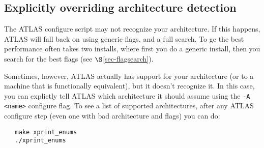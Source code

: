 \documentclass[11pt]{article}
\newcommand{\Wskip}[1]{ }
\begin{document}
\Wskip{
\subsection{Manually setting OS, architecture, assembly dialect}
\label{sec-OS-override}

Configure's selection of operating system, architecture, assembly dialect
and SIMD vectorization type are all controlled by enumerated types.
Occasionally, configure will misdetect one of these values and so
configure provides
flags for overriding configures detecting of these features.

\subsubsection{Manually overriding the assembly dialect}
\subsubsection{Manually overriding SIMD vectorization type}
\label{sec-SIMD-override}
Also, the installer
may occasionally want to refrain from using a feature that this machine
possesses, but other machines that plan to use the same library don't.
For instance, the installation machine might have SSE3, but the installer
wants to use the same library on machines that possess only SSE2, and so
the installer wants to use only SSE2, even though this will make the library
sub-optimal on the machine possessing SSE3.  
}

\subsection{Explicitly overriding architecture detection}
\label{sec-arch-override}
The ATLAS configure script may not recognize your architecture.  If this
happens, ATLAS will fall back on using generic flags, and a full search.
To ge the best performance often takes two installs, where first you
do a generic install, then you search for the best flags 
(see $\S$\ref{sec-flagsearch}).

Sometimes, however, ATLAS actually has support for your architecture
(or to a machine that is functionally equivalent), but it doesn't recognize
it.  In this case, you can explictly tell ATLAS which architecture it should
assume using the \verb+-A <name>+ configure flag.  To see a list of supported
architectures, after any ATLAS configure step (even one with bad architecture 
and flags) you can do:
\begin{verbatim}
   make xprint_enums
   ./xprint_enums
\end{verbatim}
\end{document}
